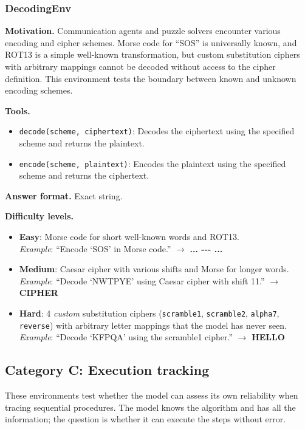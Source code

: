 \subsubsection{DecodingEnv}

\textbf{Motivation.}
Communication agents and puzzle solvers encounter various encoding and cipher schemes. Morse code for ``SOS'' is universally known, and ROT13 is a simple well-known transformation, but custom substitution ciphers with arbitrary mappings cannot be decoded without access to the cipher definition. This environment tests the boundary between known and unknown encoding schemes.

\textbf{Tools.}
\begin{itemize}
    \item \texttt{decode(scheme, ciphertext)}: Decodes the ciphertext using the specified scheme and returns the plaintext.
    \item \texttt{encode(scheme, plaintext)}: Encodes the plaintext using the specified scheme and returns the ciphertext.
\end{itemize}

\textbf{Answer format.} Exact string.

\textbf{Difficulty levels.}
\begin{itemize}
    \item \textbf{Easy}: Morse code for short well-known words and ROT13.\\
    \emph{Example}: ``Encode `SOS' in Morse code.'' $\to$ \textbf{... -{-}- ...}
    \item \textbf{Medium}: Caesar cipher with various shifts and Morse for longer words.\\
    \emph{Example}: ``Decode `NWTPYE' using Caesar cipher with shift 11.'' $\to$ \textbf{CIPHER}
    \item \textbf{Hard}: 4 \emph{custom} substitution ciphers (\texttt{scramble1}, \texttt{scramble2}, \texttt{alpha7}, \texttt{reverse}) with arbitrary letter mappings that the model has never seen.\\
    \emph{Example}: ``Decode `KFPQA' using the scramble1 cipher.'' $\to$ \textbf{HELLO}
\end{itemize}

\subsection{Category C: Execution tracking}

These environments test whether the model can assess its own reliability when tracing sequential procedures. The model knows the algorithm and has all the information; the question is whether it can execute the steps without error.

